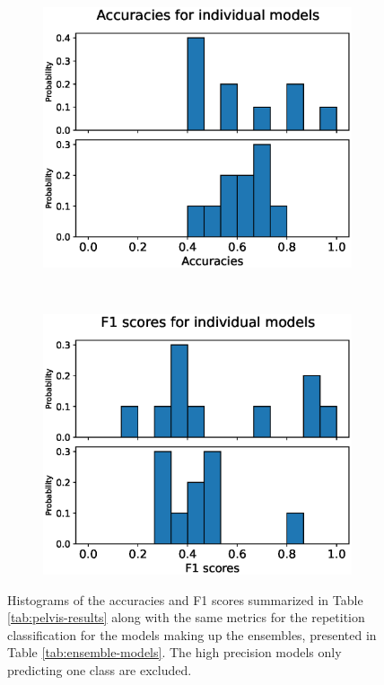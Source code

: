 \begin{figure}
  \begin{subfigure}[t]{0.4\textwidth}
    \includegraphics[width=\textwidth]{files/figs/res/pelvis/acc-ind.eps}
    \caption{}
    \label{fig:pelvis-acc-ind}
  \end{subfigure}
  ~
  \begin{subfigure}[t]{0.4\textwidth}
    \includegraphics[width=\textwidth]{files/figs/res/pelvis/f1-ind.eps}
    \caption{}
    \label{fig:pelvis-f1-ind}
  \end{subfigure}
  \caption{Histograms of the accuracies and F1 scores summarized in Table \ref{tab:pelvis-results} along with the same metrics for the repetition classification for the models making up the ensembles, presented in Table \ref{tab:ensemble-models}. The high precision models only predicting one class are excluded.}
  \label{fig:pelvis-hist-results}
\end{figure}


